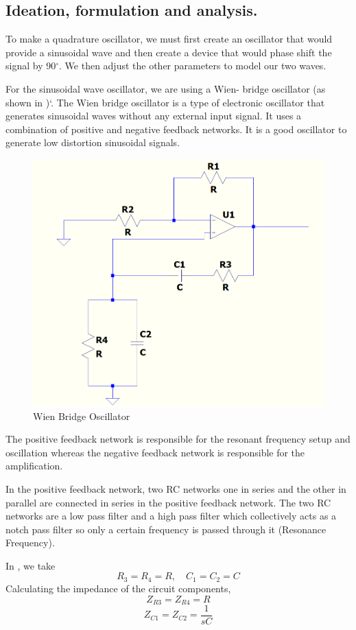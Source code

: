 \subsection{Ideation, formulation and analysis.}

To make a quadrature oscillator, we must first create an oscillator that would provide a sinusoidal wave and then create a device that would phase shift the signal by 90$^\circ$. We then adjust the other parameters to model our two waves.

For the sinusoidal wave oscillator, we are using a Wien- bridge oscillator (as shown in )`. The Wien bridge oscillator is a type of electronic oscillator that generates sinusoidal waves without any external input signal. It uses a combination of positive and negative feedback networks. It is a good oscillator to generate low distortion sinusoidal signals.

\begin{figure}[h]
    \centering
    \includegraphics[width=0.6\linewidth]{fig/wien-bridge-schem.png}
    \caption{Wien Bridge Oscillator}
    \label{fig:wien_bridge}
\end{figure}




The positive feedback network is responsible for the resonant frequency setup and oscillation whereas the negative feedback network is responsible for the amplification.

In the positive feedback network, two RC networks one in series and the other in parallel are connected in series in the positive feedback network. The two RC networks are a low pass filter and a high pass filter which collectively acts as a notch pass filter so only a certain frequency is passed through it (Resonance Frequency).

In , we take
\[
  R_3 = R_4 = R, \quad C_1 = C_2 = C
\]
Calculating the impedance of the circuit components,
$$Z_{R3} = Z_{R4} = R$$
$$Z_{C1} = Z_{C2} = \frac{1}{sC}$$

